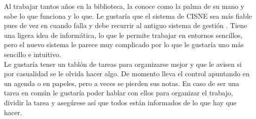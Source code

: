 \documentclass[12pt]{article}
\begin{document}
\begin{itemize}[noitemsep]
Al trabajar tantos años en la biblioteca, la conoce como la palma de su mano y sabe lo que funciona y lo que. Le gustaría que el sistema de CISNE sea más fiable pues de vez en cuando falla  y debe recurrir al antiguo sistema de gestión . Tiene una ligera idea de informática, lo que le permite trabajar en entornos sencillos, pero el nuevo sistema le parece muy complicado por lo que le gustaría uno más sencillo e intuitivo.\\

Le gustaría tener un tablón de tareas para organizarse mejor y que le avisen si por casualidad se le olvida hacer algo. De momento lleva el control apuntando en un  agenda o en papeles, pero a veces se pierden sus notas. En caso de ser una tarea en común le gustaría poder hablar con ellos para organizar el trabajo, dividir la tarea y asegúrese así que todos están informados de lo que hay que hacer.\\

\end{itemize}
\end{document}
